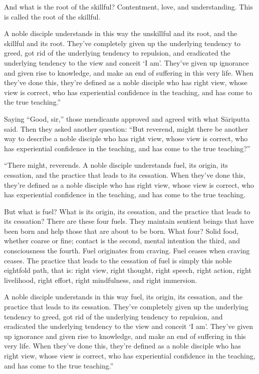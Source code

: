 \documentclass[12pt,openany]{book}%
\begin{document}
And what is the root of the skillful? Contentment, love, and understanding. This is called the root of the skillful. 

A noble disciple understands in this way the unskillful and its root, and the skillful and its root. They’ve completely given up the underlying tendency to greed, got rid of the underlying tendency to repulsion, and eradicated the underlying tendency to the view and conceit ‘I am’. They’ve given up ignorance and given rise to knowledge, and make an end of suffering in this very life. When they’ve done this, they’re defined as a noble disciple who has right view, whose view is correct, who has experiential confidence in the teaching, and has come to the true teaching.” 

Saying “Good, sir,” those mendicants approved and agreed with what \textsanskrit{Sāriputta} said. Then they asked another question: “But reverend, might there be another way to describe a noble disciple who has right view, whose view is correct, who has experiential confidence in the teaching, and has come to the true teaching?” 

“There might, reverends. A noble disciple understands fuel, its origin, its cessation, and the practice that leads to its cessation. When they’ve done this, they’re defined as a noble disciple who has right view, whose view is correct, who has experiential confidence in the teaching, and has come to the true teaching. 

But what is fuel? What is its origin, its cessation, and the practice that leads to its cessation? There are these four fuels. They maintain sentient beings that have been born and help those that are about to be born. What four? Solid food, whether coarse or fine; contact is the second, mental intention the third, and consciousness the fourth. Fuel originates from craving. Fuel ceases when craving ceases. The practice that leads to the cessation of fuel is simply this noble eightfold path, that is: right view, right thought, right speech, right action, right livelihood, right effort, right mindfulness, and right immersion. 

A noble disciple understands in this way fuel, its origin, its cessation, and the practice that leads to its cessation. They’ve completely given up the underlying tendency to greed, got rid of the underlying tendency to repulsion, and eradicated the underlying tendency to the view and conceit ‘I am’. They’ve given up ignorance and given rise to knowledge, and make an end of suffering in this very life. When they’ve done this, they’re defined as a noble disciple who has right view, whose view is correct, who has experiential confidence in the teaching, and has come to the true teaching.” 
\end{document}

